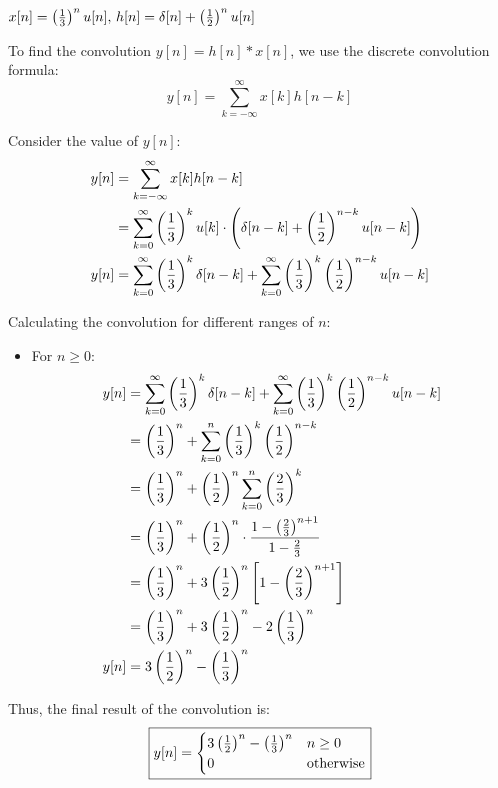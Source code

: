 \documentclass[a4paper, 10pt]{article}
\begin{document}

\newpage

\begin{subproblems}[start=4]
    \item \( x[n] = \left( \frac{1}{3} \right)^n u[n],\, h[n] = \delta[n] + \left( \frac{1}{2} \right)^n u[n] \)
\end{subproblems}

\begin{solution}
To find the convolution \( y[n] = h[n] * x[n] \), we use the discrete convolution formula:
\[ y[n] = \sum_{k=-\infty}^{\infty} x[k] h[n - k] \]

Consider the value of \( y[n] \):
\begin{align*}
    y[n] &= \sum_{k=-\infty}^{\infty} x[k] h[n - k] \\
    &= \sum_{k=0}^{\infty} \left( \frac{1}{3} \right)^k u[k] \cdot \left( \delta[n - k] + \left( \frac{1}{2} \right)^{n - k} u[n - k] \right) \\
    y[n] &= \sum_{k=0}^{\infty} \left( \frac{1}{3} \right)^k \delta[n - k] + \sum_{k=0}^{\infty} \left( \frac{1}{3} \right)^k \left( \frac{1}{2} \right)^{n - k} u[n - k] \\
\end{align*}

Calculating the convolution for different ranges of \( n \):
\begin{itemize}
    \item For \( n \geq 0 \):
    \begin{align*}
        y[n] &= \sum_{k=0}^{\infty} \left( \frac{1}{3} \right)^k \delta[n - k] + \sum_{k=0}^{\infty} \left( \frac{1}{3} \right)^k \left( \frac{1}{2} \right)^{n - k} u[n - k] \\
        &= \left( \frac{1}{3} \right)^n + \sum_{k=0}^{n} \left( \frac{1}{3} \right)^k \left( \frac{1}{2} \right)^{n - k} \\
        &= \left( \frac{1}{3} \right)^n + \left( \frac{1}{2} \right)^n \sum_{k=0}^{n} \left( \frac{2}{3} \right)^k \\
        &= \left( \frac{1}{3} \right)^n + \left( \frac{1}{2} \right)^n \cdot \frac{1 - \left( \frac{2}{3} \right)^{n+1}}{1 - \frac{2}{3}} \\
        &= \left( \frac{1}{3} \right)^n + 3 \left( \frac{1}{2} \right)^n \left[ 1 - \left( \frac{2}{3} \right)^{n+1} \right] \\
        &= \left( \frac{1}{3} \right)^n + 3 \left( \frac{1}{2} \right)^n - 2 \left( \frac{1}{3} \right)^{n} \\
        y[n] &= 3 \left( \frac{1}{2} \right)^n - \left( \frac{1}{3} \right)^{n} \\
    \end{align*}
\end{itemize}

Thus, the final result of the convolution is:
\[ \boxed{
y[n] = \begin{cases}
3 \left( \frac{1}{2} \right)^n - \left( \frac{1}{3} \right)^n & n \geq 0 \\
0 & \text{otherwise}
\end{cases}
} \]
\end{solution}
\end{document}

